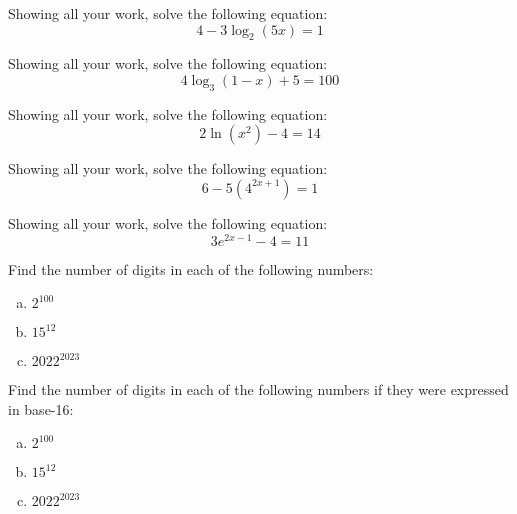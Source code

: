 \documentclass[11pt,letterpaper]{article}
\begin{document}

 Showing all your work, solve the following equation:
	\[
	4 - 3\log_2(5x)= 1
	\]



\newpage



 Showing all your work, solve the following equation:
	\[
	4 \log_3(1 - x) + 5= 100
	\]



\newpage



 Showing all your work, solve the following equation:
	\[
	2 \ln(x^2) - 4= 14
	\]



\newpage



 Showing all your work, solve the following equation:
	\[
	6 - 5(4^{2x + 1})= 1
	\]



\newpage



 Showing all your work, solve the following equation:
	\[
	3e^{2x - 1} - 4= 11
	\]



\newpage



 Find the number of digits in each of the following numbers:
	\begin{enumerate}[(a)]
	\item $2^{100}$
	\item $15^{12}$
	\item $2022^{2023}$
	\end{enumerate}



\newpage



 Find the number of digits in each of the following numbers if they were expressed in base-16:
	\begin{enumerate}[(a)]
	\item $2^{100}$
	\item $15^{12}$
	\item $2022^{2023}$
	\end{enumerate}
\end{document}
